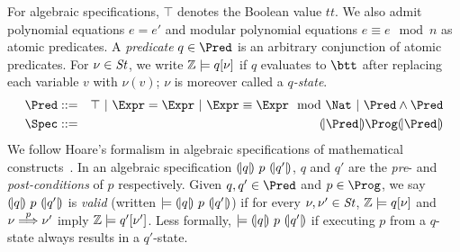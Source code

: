 For algebraic specifications, $\top$ denotes the Boolean value
$\mathit{tt}$. We also admit polynomial equations $e = e'$ and modular
polynomial equations $e \equiv e \mod n$ as atomic predicates.
A \emph{predicate} $q \in \Pred$ is an arbitrary conjunction of atomic
predicates. For 
$\nu \in \mathit{St}$, we write $\mathbb{Z} \models q[\nu]$ if $q$
evaluates to $\btt$ after replacing each variable $v$ with
$\nu(v)$; $\nu$ is moreover called a \emph{$q$-state}.
\begin{eqnarray*}
  \Pred & ::= & \top
     \ |\   \Expr = \Expr
     \ |\   \Expr \equiv \Expr \mod \Nat
     \ |\   \Pred \wedge \Pred\\
  \Spec & ::= & \cond{\Pred} \Prog \cond{\Pred}
\end{eqnarray*}
We follow Hoare's formalism in algebraic specifications of
mathematical constructs~\cite{H:69:ABCP}. In an algebraic
specification ${(\!|}{q}{|\!)}~{p}~{(\!|}{q'}{|\!)}$, $q$ and $q'$ are the \emph{pre}- and
\emph{post-conditions} of $p$ respectively. Given $q, q' \in \Pred$ and $p
\in \Prog$, we say ${(\!|}{q}{|\!)}~{p}~{(\!|}{q'}{|\!)}$ is \emph{valid}
(written $\models {(\!|}{q}{|\!)}~{p}~{(\!|}{q'}{|\!)}$) if for every $\nu, \nu' \in
\mathit{St}$, $\mathbb{Z} \models q[\nu]$ and $\nu \overset{p}{\Longrightarrow} \nu'$ imply
$\mathbb{Z} \models q'[\nu']$. Less formally, $\models
{(\!|}{q}{|\!)}~{p}~{(\!|}{q'}{|\!)}$ if executing $p$ from a $q$-state always
results in a $q'$-state. 
